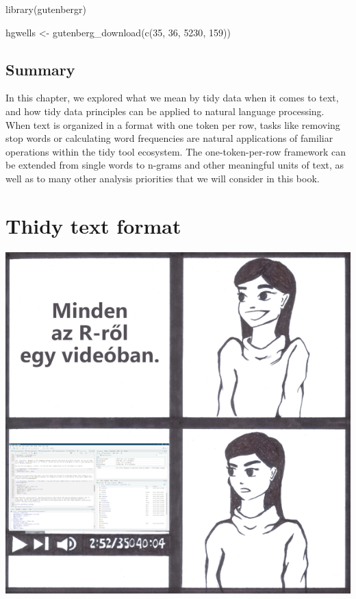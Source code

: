 \documentclass[
]{book}
\newenvironment{Shaded}{\begin{snugshade}}{\end{snugshade}}
\newcommand{\DecValTok}[1]{\textcolor[rgb]{0.00,0.00,0.81}{#1}}
\newcommand{\FunctionTok}[1]{\textcolor[rgb]{0.00,0.00,0.00}{#1}}
\newcommand{\NormalTok}[1]{#1}
\newcommand{\OtherTok}[1]{\textcolor[rgb]{0.56,0.35,0.01}{#1}}
\begin{document}
\begin{Shaded}
\begin{Highlighting}[]
\FunctionTok{library}\NormalTok{(gutenbergr)}

\NormalTok{hgwells }\OtherTok{\textless{}{-}} \FunctionTok{gutenberg\_download}\NormalTok{(}\FunctionTok{c}\NormalTok{(}\DecValTok{35}\NormalTok{, }\DecValTok{36}\NormalTok{, }\DecValTok{5230}\NormalTok{, }\DecValTok{159}\NormalTok{))}
\end{Highlighting}
\end{Shaded}

\hypertarget{summary}{%
\section{Summary}\label{summary}}

In this chapter, we explored what we mean by tidy data when it comes to text, and how tidy data principles can be applied to natural language processing. When text is organized in a format with one token per row, tasks like removing stop words or calculating word frequencies are natural applications of familiar operations within the tidy tool ecosystem. The one-token-per-row framework can be extended from single words to n-grams and other meaningful units of text, as well as to many other analysis priorities that we will consider in this book.

\hypertarget{tidynntext}{%
\chapter{Thidy text format}\label{tidynntext}}

\begin{center}\includegraphics[width=0.9\linewidth]{images/ch_02_small} \end{center}
\end{document}
